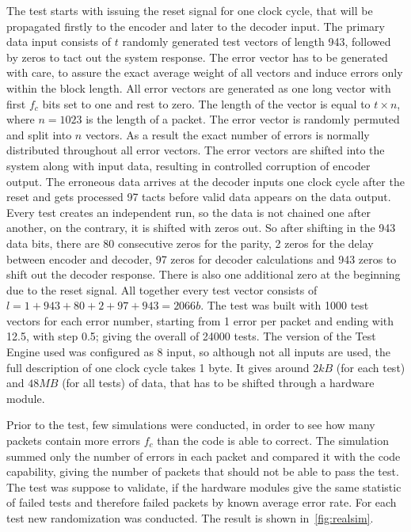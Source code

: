 The test starts with issuing the reset signal for one clock cycle, that will be propagated firstly to the encoder and later to the decoder input. The primary data input consists of $t$ randomly generated test vectors of length 943, followed by zeros to tact out the system response. The error vector has to be generated with care, to assure the exact average weight of all vectors and induce errors only within the block length. All error vectors are generated as one long vector with first $f_c$ bits set to one and rest to zero. The length of the vector is equal to $t\times n$, where $n=1023$ is the length of a packet. The error vector is randomly permuted and split into $n$ vectors. As a result the exact number of errors is normally distributed throughout all error vectors. The error vectors are shifted into the system along with input data, resulting in controlled corruption of encoder output. The erroneous data arrives at the decoder inputs one clock cycle after the reset and gets processed 97 tacts before valid data appears on the data output. Every test creates an independent run, so the data is not chained one after another, on the contrary, it is shifted with zeros out. So after shifting in the 943 data bits, there are 80 consecutive zeros for the parity, 2 zeros for the delay between encoder and decoder, 97 zeros for decoder calculations and 943 zeros to shift out the decoder response. There is also one additional zero at the beginning due to the reset signal. All together every test vector consists of $l=1+943+80+2+97+943=2066b$. The test was built with 1000 test vectors for each error number, starting from 1 error per packet and ending with 12.5, with step 0.5; giving the overall of 24000 tests. The version of the Test Engine used was configured as 8 input, so although not all inputs are used, the full description of one clock cycle takes 1 byte. It gives around $2kB$ (for each test) and $48MB$ (for all tests) of data, that has to be shifted through a hardware module.

Prior to the test, few simulations were conducted, in order to see how many packets contain more errors $f_c$ than the code is able to correct. The simulation summed only the number of errors in each packet and compared it with the code capability, giving the number of packets that should not be able to pass the test. The test was suppose to validate, if the hardware modules give the same statistic of failed tests and therefore failed packets by known average error rate. For each test new randomization was conducted. The result is shown in~\autoref{fig:realsim}.

